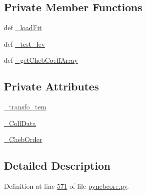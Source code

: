\subsection*{Private Member Functions}
\begin{DoxyCompactItemize}
\item 
def \hyperlink{classpyneb_1_1core_1_1pynebcore_1_1___coll_data_fits_aaed9e4985dc03f6120dfc714a3595536}{\-\_\-load\-Fit}
\item 
def \hyperlink{classpyneb_1_1core_1_1pynebcore_1_1___coll_data_fits_a0654555565cc60412d6f639a9a3289ff}{\-\_\-test\-\_\-lev}
\item 
def \hyperlink{classpyneb_1_1core_1_1pynebcore_1_1___coll_data_fits_a6f9e4fd3e9196fe259da3175e14b88b9}{\-\_\-get\-Cheb\-Coeff\-Array}
\end{DoxyCompactItemize}
\subsection*{Private Attributes}
\begin{DoxyCompactItemize}
\item 
\hyperlink{classpyneb_1_1core_1_1pynebcore_1_1___coll_data_fits_afa9318fd2557709e968682f47cefa379}{\-\_\-transfo\-\_\-tem}
\item 
\hyperlink{classpyneb_1_1core_1_1pynebcore_1_1___coll_data_fits_a34f70aba84a783d1a5a8633f797f7bb1}{\-\_\-\-Coll\-Data}
\item 
\hyperlink{classpyneb_1_1core_1_1pynebcore_1_1___coll_data_fits_aeb6a6f312ca21c1e1b3aa72225a0d442}{\-\_\-\-Cheb\-Order}
\end{DoxyCompactItemize}


\subsection{Detailed Description}


Definition at line \hyperlink{pynebcore_8py_source_l00571}{571} of file \hyperlink{pynebcore_8py_source}{pynebcore.\-py}.



